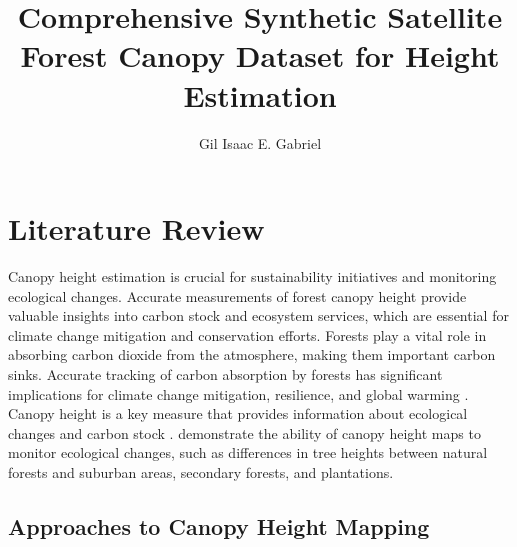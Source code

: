 \documentclass[12pt, man, dvipsnames, floatsintext]{apa7}
\title{Comprehensive Synthetic Satellite Forest Canopy Dataset for Height Estimation}
\author{Gil Isaac E. Gabriel}
\affiliation{{Department of Geography and Planning, West Chester University of Pennsylvania}} %
\begin{document}

\maketitle

%

  




\hypertarget{literature-review}{%
\section{Literature Review}\label{literature-review}}

Canopy height estimation is crucial for sustainability initiatives and
monitoring ecological changes. Accurate measurements of forest canopy
height provide valuable insights into carbon stock and ecosystem
services, which are essential for climate change mitigation and
conservation efforts. Forests play a vital role in absorbing carbon
dioxide from the atmosphere, making them important carbon sinks.
Accurate tracking of carbon absorption by forests has significant
implications for climate change mitigation, resilience, and global
warming \parencite{Lang2023}. Canopy height is a key measure that
provides information about ecological changes and carbon stock
\parencite{Potapov2021,Tang2024}. \textcite{Potapov2021} demonstrate the
ability of canopy height maps to monitor ecological changes, such as
differences in tree heights between natural forests and suburban areas,
secondary forests, and plantations.

\hypertarget{approaches-to-canopy-height-mapping}{%
\subsection{Approaches to Canopy Height
Mapping}\label{approaches-to-canopy-height-mapping}}
\end{document}

